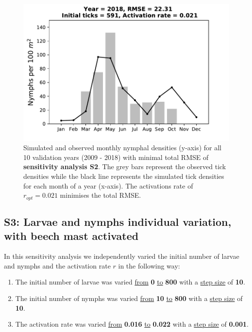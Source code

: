 \documentclass[a4paper, 11pt]{scrartcl}
\begin{document}
\begin{figure}[h!]
\begin{minipage}[c]{0.40\linewidth}
\end{minipage}
\begin{minipage}[c]{0.40\linewidth}
\includegraphics[width=\linewidth]{figures/s2/s2_2018}
\end{minipage}
\caption{Simulated and observed monthly nymphal densities (y-axis) for all 10 validation years (2009 - 2018) with minimal total RMSE of \textbf{sensitivity analysis S2}. The
grey bars represent the observed tick densities while the black line represents the simulated tick densities for each month of a year (x-axis). The activations rate of
$r_{opt}= 0.021$ minimises the total RMSE.}
\label{fig:initial_ticks_without_beech}
\end{figure}


\newpage
\subsection{S3: Larvae and nymphs individual variation, with beech mast activated}
In this sensitivity analysis we independently varied the initial number of larvae and nymphs and the activation rate $r$ in the following way:

\begin{enumerate}
\item The initial number of larvae was varied \underline{from} \textbf{0} \underline{to} \textbf{800} with a \underline{step size} of \textbf{10}.
\item The initial number of nymphs was varied \underline{from} \textbf{10} \underline{to} \textbf{800} with a \underline{step size} of \textbf{10}.
\item The activation rate was varied \underline{from} \textbf{0.016} \underline{to} \textbf{0.022} with a \underline{step size} of \textbf{0.001}.
\end{enumerate}
\end{document}
